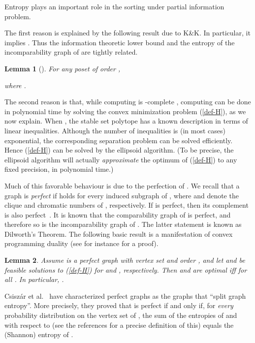 \documentclass{article} \usepackage{fullpage}
\newtheorem{lemma}{Lemma}
\begin{document}
Entropy plays an important role in the sorting under partial information problem. 

The first reason is explained by the following result due to K\&K. In particular, it implies . Thus the information theoretic lower bound and the entropy of the incomparability graph of  are tightly related.

\begin{lemma}[\cite{KK95}]
\label{lem:kk}
For any poset  of order ,

where .
\end{lemma}

The second reason is that, while computing  is -complete \cite{BW91}, computing  can be done in polynomial time by solving the convex minimization problem (\ref{def-H}), as we now explain. When , the stable set polytope  has a known description in terms of linear inequalities. Although the number of inequalities is (in most cases) exponential, the corresponding separation problem can be solved efficiently. Hence (\ref{def-H}) can be solved by the ellipsoid algorithm. 
(To be precise, the ellipsoid algorithm will actually {\em approximate}
the optimum of (\ref{def-H}) to any fixed precision, in polynomial time.)

Much of this favorable behaviour is due to the perfection of . We recall that a graph  is {\sl perfect\/} if  holds for every induced subgraph  of , where  and  denote the clique and chromatic numbers of , respectively. If  is perfect, then its complement  is also perfect~\cite{L72}. It is known that the comparability graph  of  is perfect, and therefore so is the incomparability graph  of . The latter statement is known as Dilworth's Theorem. The following basic result is a manifestation of convex programming duality (see for instance \cite{S95} for a proof).

\begin{lemma}
\label{lem:perf}
Assume  is a perfect graph with vertex set  and order , and let  and  be feasible solutions to (\ref{def-H}) for  and , respectively. Then  and  are optimal iff  for all . In particular, .
\end{lemma}

Csisz{\'a}r et al.~\cite{CKLMS90} have characterized perfect graphs as the graphs that ``split graph entropy''. More precisely, they proved that  is perfect if and only if, for {\em every\/} probability distribution  on the vertex set of , the sum of the entropies of  and  with respect to  (see the references for a precise definition of this) equals the (Shannon) entropy of .
\end{document}
